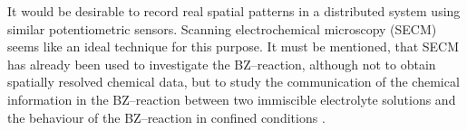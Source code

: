 \documentclass[3p, twocolumn]{elsarticle}
\begin{document}

It would be desirable to record real spatial patterns in a distributed system using similar potentiometric sensors.
Scanning electrochemical microscopy (SECM) seems like an ideal technique for this purpose. 
It must be mentioned, that SECM has already been used to investigate the BZ--reaction, although not to obtain spatially resolved chemical data, but to study the communication of the chemical information in the BZ--reaction between two immiscible electrolyte solutions \cite{tomasi2014chemical} and the behaviour of the BZ--reaction in confined conditions \cite{stockmann2015scanning}. 
\end{document}
